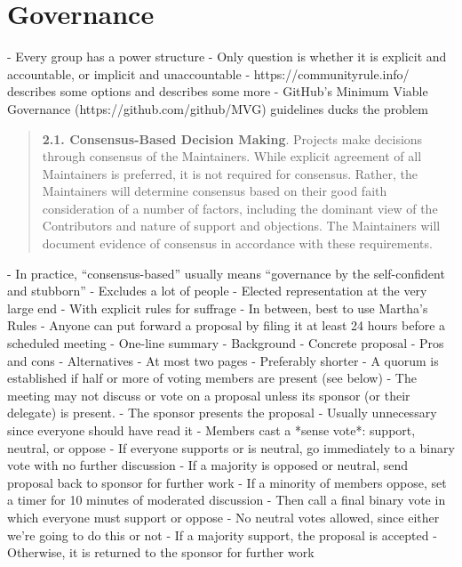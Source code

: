 \documentclass[10pt,letterpaper]{article}
\begin{document}
\section{Governance}

- Every group has a power structure
  - Only question is whether it is explicit and accountable, or implicit and unaccountable \cite{Freeman1972}
- https://communityrule.info/ describes some options and \cite{Fogel2021} describes some more
- GitHub's Minimum Viable Governance (https://github.com/github/MVG) guidelines ducks the problem

\begin{quotation}
  \textbf{2.1. Consensus-Based Decision Making}.
  Projects make decisions through consensus of the Maintainers.
  While explicit agreement of all Maintainers is preferred, it is not required for consensus.
  Rather, the Maintainers will determine consensus based on their good faith consideration of a number of factors,
  including the dominant view of the Contributors and nature of support and objections.
  The Maintainers will document evidence of consensus in accordance with these requirements.
\end{quotation}

- In practice, ``consensus-based'' usually means ``governance by the self-confident and stubborn''
  - Excludes a lot of people
- Elected representation at the very large end
  - With explicit rules for suffrage
- In between, best to use Martha's Rules \cite{Minahan1986}
- Anyone can put forward a proposal by filing it at least 24 hours before a scheduled meeting
  - One-line summary
  - Background
  - Concrete proposal
  - Pros and cons
  - Alternatives
- At most two pages
  - Preferably shorter
- A quorum is established if half or more of voting members are present (see below)
- The meeting may not discuss or vote on a proposal unless its sponsor (or their delegate) is present.
- The sponsor presents the proposal
  - Usually unnecessary since everyone should have read it
- Members cast a *sense vote*: support, neutral, or oppose
  - If everyone supports or is neutral, go immediately to a binary vote with no further discussion
  - If a majority is opposed or neutral, send proposal back to sponsor for further work
- If a minority of members oppose, set a timer for 10 minutes of moderated discussion
- Then call a final binary vote in which everyone must support or oppose
  - No neutral votes allowed, since either we're going to do this or not
- If a majority support, the proposal is accepted
  - Otherwise, it is returned to the sponsor for further work
\end{document}
